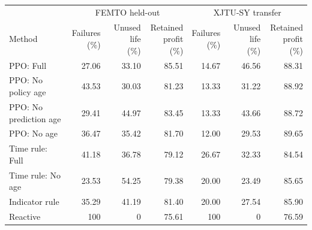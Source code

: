 {\footnotesize\setlength{\tabcolsep}{3pt}\renewcommand{\arraystretch}{1.08}%
\begin{tabular}{@{}lrrrrrr@{}}
\toprule
 & \multicolumn{3}{c}{FEMTO held-out} & \multicolumn{3}{c}{XJTU-SY transfer}\\
\cmidrule(lr){2-4}\cmidrule(l){5-7}
Method & \shortstack{Failures\\(\%)} & \shortstack{Unused life\\(\%)} & \shortstack{Retained\\profit (\%)} & \shortstack{Failures\\(\%)} & \shortstack{Unused life\\(\%)} & \shortstack{Retained\\profit (\%)}\\
\midrule
PPO: Full & 27.06 & 33.10 & 85.51 & 14.67 & 46.56 & 88.31\\
PPO: No policy age & 43.53 & 30.03 & 81.23 & 13.33 & 31.22 & 88.92\\
PPO: No prediction age & 29.41 & 44.97 & 83.45 & 13.33 & 43.66 & 88.72\\
PPO: No age & 36.47 & 35.42 & 81.70 & 12.00 & 29.53 & 89.65\\
\midrule
Time rule: Full & 41.18 & 36.78 & 79.12 & 26.67 & 32.33 & 84.54\\
Time rule: No age & 23.53 & 54.25 & 79.38 & 20.00 & 23.49 & 85.65\\
\midrule
Indicator rule & 35.29 & 41.19 & 81.40 & 20.00 & 27.54 & 85.90\\
Reactive & 100 & 0 & 75.61 & 100 & 0 & 76.59\\
\bottomrule
\end{tabular}}
